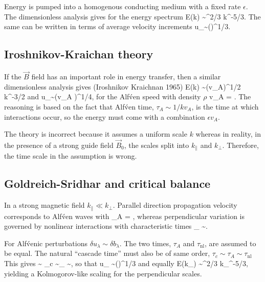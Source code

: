 \documentclass[usenatbib,twocolumn, twocolappendix]{aastex63}
\begin{document}
Energy is pumped into a homogenous conducting medium with a fixed rate $\epsilon$.
The dimensionless analysis gives for the energy spectrum \citep{Kolmogorov_1941}
\be
E(k) \sim \epsilon^{2/3} k^{-5/3}.
\ee
The same can be written in terms of average velocity increments
\be
\delta u_\lambda \sim (\epsilon \lambda)^{1/3}.
\ee

\subsection{Iroshnikov-Kraichan theory}\label{sect:K65}

If the $\vec{B}$ field has an important role in energy transfer, then a similar dimensionless analysis gives (Iroshnikov Kraichnan 1965)
\be
E(k) \sim (\epsilon v_A)^{1/2} k^{-3/2}
\ee
and
\be
\delta u_\lambda \sim (\epsilon v_A \lambda)^{1/4},
\ee
for the Alf\'ven speed with density $\rho$
\be
v_A = .
\ee
The reasoning is based on the fact that Alf\'ven time, $\tau_A \sim 1/k v_A$, is the time at which interactions occur, so the energy must come with a combination $\epsilon v_A$.

The theory is incorrect because it assumes a uniform scale $k$ whereas in reality, in the presence of a strong guide field $\vec{B}_0$, the scales split into $k_{\parallel}$ and $k_{\perp}$.
Therefore, the time scale in the assumption is wrong.


\subsection{Goldreich-Sridhar and critical balance}\label{sect:GS95}

In a strong magnetic field $k_{\parallel} \ll k_{\perp}$.
Parallel direction propagation velocity corresponds to Alf\'ven waves with 
\be
\tau_A = ,
\ee
whereas perpendicular variation is governed by nonlinear interactions with characteristic times
\be
\tau_{} \sim {}.
\ee

For Alf\'venic perturbations $\delta u_{\lambda} \sim \delta b_{\lambda}$.
The two times, $\tau_A$ and $\tau_{\mathrm{nl}}$, are assumed to be equal.
The natural ``cascade time'' must also be of same order, $\tau_c \sim \tau_A \sim \tau_{\mathrm{nl}}$
This gives 
\be
{} \sim \epsilon \quad{}\quad
\tau_c \sim \tau_{} \sim {},
\ee
so that
\be
\delta u_{\lambda} \sim (\epsilon \lambda)^{1/3}
\ee
and equally \citep{Goldreich_1995, 1997}
\be
E(k_\perp) \sim \epsilon^{2/3} k_{\perp}^{-5/3},
\ee
yielding a Kolmogorov-like scaling for the perpendicular scales.
\end{document}
